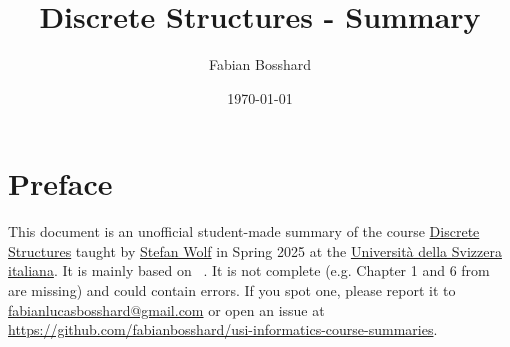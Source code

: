 
\usepackage{caption, subcaption}

\usepackage[backend=biber,style=numeric]{biblatex}



\usepackage[
  pdfauthor={Fabian Bosshard},
  pdftitle={USI - Discrete Structures - Course Summary},
  pdfkeywords={USI, discrete structures, course summary, informatics},
  colorlinks=false,        %
  pdfborder={0 0 0}        %
]{hyperref}
\usepackage[
  type     = {CC},
  modifier = {by},
  version  = {4.0},
]{doclicense}
\usepackage{cleveref}







\title{Discrete Structures - Summary}
\author{Fabian Bosshard}
\date{\today}






\pagestyle{plain}


\maketitle


\tableofcontents







\section*{Preface}

This document is an unofficial student-made summary of the course 
\href{https://search.usi.ch/courses/35270737/discrete-structures}{Discrete Structures} taught by \href{https://search.usi.ch/people/eefbe656c9dfacf0e1a1e15bf8893bcb/wolf-stefan}{Stefan Wolf} in Spring 2025 at the 
\href{https://www.usi.ch/it}{Università della Svizzera italiana}.
It is mainly based on ~\cite{boschini2022}.
It is not complete (e.g. Chapter 1 and 6 from \cite{boschini2022} are missing) and could contain errors.
If you spot one, please report it to \href{mailto:fabianlucasbosshard@gmail.com}{fabianlucasbosshard@gmail.com} or open an issue at \url{https://github.com/fabianbosshard/usi-informatics-course-summaries}.


